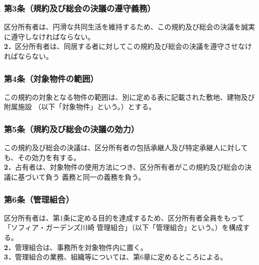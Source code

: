 \documentclass[
  luatex,
  paper=a4paper,
  fontsize=11pt,
  jafontsize=10pt,
  jlreq_notes,
]{jlreq}
\begin{document}
  \renewenvironment{description}
  {\begin{list}{}{
        \let\makelabel\descriptionlabel
        \setlength\labelwidth{2em}%
        \setlength\itemsep{0pt}%
        \setlength\parsep{0pt}%
        \setlength\labelsep{2pt}%
        \setlength\leftmargin{\labelwidth+\labelsep}
        }
  }
  {\end{list}}
  
  \subsubsection*{ 第3条（規約及び総会の決議の遵守義務）}
  区分所有者は、円滑な共同生活を維持するため、この規約及び総会の決議を誠実に遵守しなければならない。\\
  \textbf{2．}区分所有者は、同居する者に対してこの規約及び総会の決議を遵守させなければならない。
  \subsubsection*{ 第4条（対象物件の範囲）}
  この規約の対象となる物件の範囲は、別に定める表に記載された敷地、建物及び附属施設
  （以下「対象物件」という。）とする。
  \subsubsection*{ 第5条（規約及び総会の決議の効力）}
  この規約及び総会の決議は、区分所有者の包括承継人及び特定承継人に対しても、その効力を有する。\\
  \textbf{2．}占有者は、対象物件の使用方法につき、区分所有者がこの規約及び総会の決議に基づいて負う
  義務と同一の義務を負う。
  \subsubsection*{ 第6条（管理組合）}
  区分所有者は、第1条に定める目的を達成するため、区分所有者全員をもって「ソフィア・ガーデンズ川崎
  管理組合」（以下「管理組合」という。）を構成する。\\
  \textbf{2．}管理組合は、事務所を対象物件内に置く。\\
  \textbf{3．}管理組合の業務、組織等については、第6章に定めるところによる。\\
  
\end{document}
